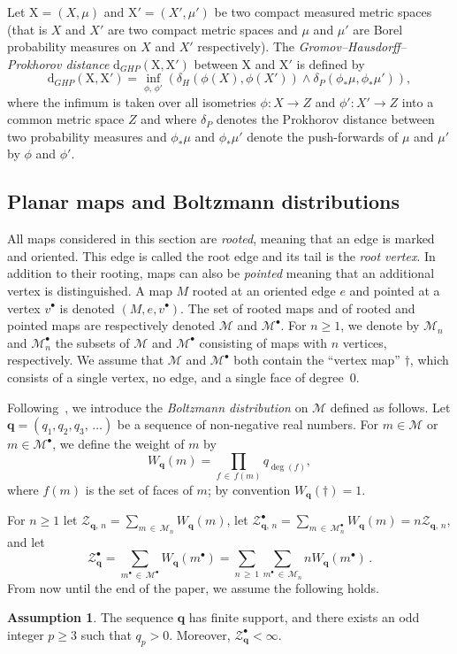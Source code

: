 \documentclass[10pt]{amsart}
\theoremstyle{definition}\newtheorem{defi}[theo]{Definition}\newtheorem{rema}[theo]{Remark}\newtheorem{exam}[theo]{Example}\newtheorem{exem}[theo]{Example}\newtheorem{nota}[theo]{Notation}
\newtheorem{assumption}{Assumption}
\newcommand{\bfq}{\mathbf{q}}
\newcommand{\cM}{\mathcal{M}}
\newcommand{\cZ}{\mathcal{Z}}
\newcommand{\rX}{\mathrm{X}}
\newcommand{\rXi}{\mathrm{X'}}
\newcommand{\rd}{\mathrm{d}}
\DeclareMathOperator{\Deg}{deg}
\newcommand{\sbt}{{\ensuremath{\scriptscriptstyle\bullet}}}
\begin{document}
Let $\rX=(X,\mu)$ and $\rXi=(X',\mu')$ be two compact measured metric spaces (that is $X$ and $X'$ are two compact metric spaces and $\mu$ and $\mu'$ are Borel probability measures on $X$ and $X'$ respectively). The \emph{Gromov--Hausdorff--Prokhorov distance} $\rd_{GHP}(\rX,\rXi)$ between $\rX$ and $\rXi$ is defined by
\[
\rd_{GHP}(\rX, \rXi)=\inf_{\phi,\,\phi'}\left(\delta_H\left(\phi(X),\phi(X')\right)\wedge \delta_P\left(\phi_*\mu,\phi_*\mu'\right)\right),
\]
where the infimum is taken over all isometries $\phi:X\rightarrow Z$ and $\phi':X'\rightarrow Z$ into a common metric space $Z$ and where $\delta_P$ denotes the Prokhorov distance between two probability measures and $\phi_*\mu$ and $\phi_*\mu'$ denote the push-forwards of $\mu$ and $\mu'$ by $\phi$ and $\phi'$.


\subsection{Planar maps and Boltzmann distributions}\label{sub:maps}

All maps considered in this section are \emph{rooted}, meaning that an edge is marked and oriented. This edge is called the root edge and its tail is the \emph{root vertex}. In addition to their rooting, maps can also be \emph{pointed} meaning that an additional vertex is distinguished. A map $M$ rooted at an oriented edge $e$ and pointed at a vertex $v^\sbt$ is denoted $(M,e,v^\sbt)$. The set of rooted maps and of rooted and pointed maps are respectively denoted $\cM$ and $\cM^\bullet$. For $n\geq 1$, we denote by $\cM_n$ and $\cM^\bullet_n$ the subsets of $\cM$ and $\cM^\bullet$ consisting of maps with $n$ vertices, respectively. We assume that $\cM$ and $\cM^\bullet$ both contain the ``vertex map'' $\dagger$, which consists of a single vertex, no edge, and a single face of degree~0.

Following~\cite{MiermontInvariance,MarckertMiermontInvariance}, we introduce the \emph{Boltzmann distribution} on $\cM$ defined as follows. Let $\bfq=(q_1,q_2,q_3,\,\ldots)$ be a sequence of non-negative real numbers. For $m\in \cM$ or $m\in \cM^\bullet$, we define the weight of $m$ by
\[
W_{\bfq}(m) = \prod_{f\,\in\,f(m)}q_{\Deg(f)},
\]
where $f(m)$ is the set of faces of $m$; by convention $W_{\bfq}(\dagger)=1$.

For $n \ge 1$ let $\cZ_{\bfq,\,n}=\sum_{m\,\in \,\cM_n}W_{\bfq}(m)$, let $\cZ^\bullet_{\bfq,\,n} = \sum_{m\,\in\,\cM^\bullet_n} W_{\bfq}(m) = n \cZ_{\bfq,\,n}$, and let
\[
\cZ^\bullet_{\bfq}=\sum_{m^\sbt\,\in\,\cM^\bullet}W_{\bfq}(m^\sbt) = \sum_{n\,\ge\,1}\sum_{m^\sbt\,\in\,\cM_n} nW_{\bfq}(m^\sbt)\,.
\]
From now until the end of the paper, we assume the following holds.
\setcounter{assumption}{0}
\begin{assumption}\label{assum:q}
The sequence $\bfq$ has finite support, and there exists an odd integer $p\geq 3$ such that $q_p>0$. Moreover, $\cZ_{\bfq}^{\bullet}<\infty$.
\end{assumption}
\end{document}
